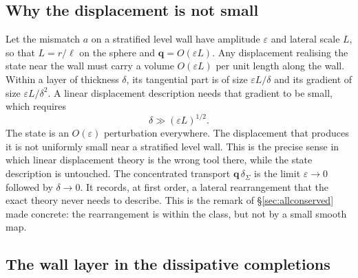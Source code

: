 \documentclass[11pt]{article}
\theoremstyle{definition}
\theoremstyle{remark}
\newcommand{\bq}{\mathbf{q}}
\begin{document}
\subsection{Why the displacement is not small}
\label{sec:notsmall}

Let the mismatch $a$ on a stratified level wall have amplitude
$\varepsilon$ and lateral scale $L$, so that $L = r/\ell$ on the
sphere and $\bq = O(\varepsilon L)$. Any displacement realising the
state near the wall must carry a volume $O(\varepsilon L)$ per unit
length along the wall. Within a layer of thickness $\delta$, its
tangential part is of size $\varepsilon L/\delta$ and its gradient of
size $\varepsilon L/\delta^2$. A linear displacement description needs
that gradient to be small, which requires
\begin{equation*}
  \delta \gg (\varepsilon L)^{1/2} .
\end{equation*}
The state is an $O(\varepsilon)$ perturbation everywhere. The
displacement that produces it is not uniformly small near a stratified
level wall. This is the precise sense in which linear displacement
theory is the wrong tool there, while the state description is
untouched. The concentrated transport $\bq\,\delta_\Sigma$ is the limit
$\varepsilon \to 0$ followed by $\delta \to 0$. It records, at first
order, a lateral rearrangement that the exact theory never needs to
describe. This is the remark of \S\ref{sec:allconserved} made concrete:
the rearrangement is within the class, but not by a small smooth map.

\subsection{The wall layer in the dissipative completions}
\label{sec:dissipative}
\end{document}
